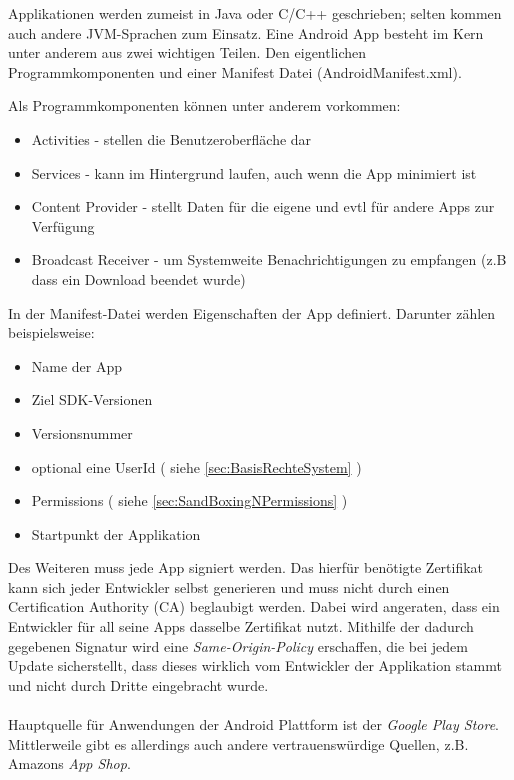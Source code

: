 \begin{flushleft}
	Applikationen werden zumeist in Java oder C/C++ geschrieben; selten kommen auch andere JVM-Sprachen zum Einsatz.
	Eine Android App besteht im Kern unter anderem aus zwei wichtigen Teilen. Den eigentlichen Programmkomponenten und einer Manifest Datei (AndroidManifest.xml).\\
\end{flushleft}
	Als Programmkomponenten können unter anderem vorkommen:
	\begin{itemize}\itemsep0pt
		\item Activities - stellen die Benutzeroberfläche dar
		\item Services - kann im Hintergrund laufen, auch wenn die App minimiert ist
		\item Content Provider - stellt Daten für die eigene und evtl für andere Apps zur Verfügung
		\item Broadcast Receiver - um Systemweite Benachrichtigungen zu empfangen (z.B dass ein Download beendet wurde)
	\end{itemize}
	In der Manifest-Datei werden Eigenschaften der App definiert. Darunter zählen beispielsweise:
	\begin{itemize}\itemsep0pt
		\item Name der App
		\item Ziel SDK-Versionen
		\item Versionsnummer
		\item optional eine UserId ( siehe \ref*{sec:BasisRechteSystem} )
		\item Permissions ( siehe \ref*{sec:SandBoxingNPermissions} )
		\item Startpunkt der Applikation
	\end{itemize}
	Des Weiteren muss jede App signiert werden. Das hierfür benötigte Zertifikat kann sich jeder Entwickler selbst generieren und muss nicht durch einen Certification Authority (CA) beglaubigt werden. Dabei wird angeraten, dass ein Entwickler für all seine Apps dasselbe Zertifikat nutzt. Mithilfe der dadurch gegebenen Signatur wird eine \textit{Same-Origin-Policy} erschaffen, die bei jedem Update sicherstellt, dass dieses wirklich vom Entwickler der Applikation stammt und nicht durch Dritte eingebracht wurde.\\\\
	Hauptquelle für Anwendungen der Android Plattform ist der \textit{Google Play Store}. Mittlerweile gibt es allerdings auch andere vertrauenswürdige Quellen, z.B. Amazons \textit{App Shop}.